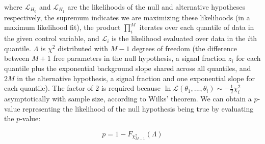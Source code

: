 where $\mathcal{L}_{H_0}$ and $\mathcal{L}_{H_1}$ are the likelihoods of the null and alternative hypotheses respectively, the supremum indicates we are maximizing these likelihoods (in a maximum likelihood fit), the product $\prod_i^M$ iterates over each quantile of data in the given control variable, and $\mathcal{L}_i$ is the likelihood evaluated over data in the $i$th quantile. $\Lambda$ is $\chi^2$ distributed with $M - 1$ degrees of freedom (the difference between $M + 1$ free parameters in the null hypothesis, a signal fraction $z_i$ for each quantile plus the exponential background slope shared across all quantiles, and $2M$ in the alternative hypothesis, a signal fraction and one exponential slope for each quantile). The factor of $2$ is required because $\ln\mathcal{L}(\theta_1,...,\theta_i) \sim -\frac{1}{2}\chi^2_i$ asymptotically with sample size, according to Wilks' theorem. We can obtain a $p$-value representing the likelihood of the null hypothesis being true by evaluating the $p$-value:

\begin{equation}
  p = 1 - F_{\chi^2_{M-1}}(\Lambda)
  \label{eq:significance-test}
\end{equation}

